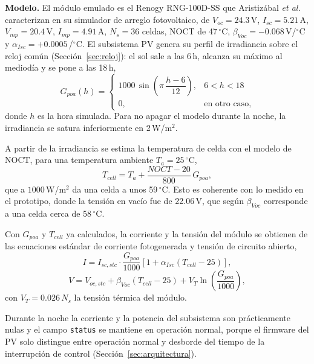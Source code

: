 \documentclass[conference]{IEEEtran}
\begin{document}
\textbf{Modelo.} El módulo emulado es el Renogy RNG-100D-SS que Aristizábal \emph{et al.}~\cite{aristizabal2026pv} caracterizan en su simulador de arreglo fotovoltaico, de $V_{oc}=24.3$\,V, $I_{sc}=5.21$\,A, $V_{mp}=20.4$\,V, $I_{mp}=4.91$\,A, $N_s=36$ celdas, NOCT de 47\,$^{\circ}$C, $\beta_{Voc}=-0.068$\,V/$^{\circ}$C y $\alpha_{Isc}=+0.0005$\,/$^{\circ}$C. El subsistema PV genera su perfil de irradiancia sobre el reloj común (Sección~\ref{sec:reloj}): el sol sale a las 6\,h, alcanza su máximo al mediodía y se pone a las 18\,h,
\begin{equation}
\label{eq:pv_G}
G_{poa}(h) = \begin{cases}
1000\,\sin\!\left(\pi\,\dfrac{h-6}{12}\right), & 6 < h < 18 \\[6pt]
0, & \text{en otro caso,}
\end{cases}
\end{equation}
donde $h$ es la hora simulada. Para no apagar el modelo durante la noche, la irradiancia se satura inferiormente en 2\,W/m$^2$.

A partir de la irradiancia se estima la temperatura de celda con el modelo de NOCT, para una temperatura ambiente $T_a=25\,^{\circ}$C,
\begin{equation}
\label{eq:pv_Tcell}
T_{cell} = T_a + \frac{NOCT-20}{800}\,G_{poa},
\end{equation}
que a $1000$\,W/m$^2$ da una celda a unos 59\,$^{\circ}$C. Esto es coherente con lo medido en el prototipo, donde la tensión en vacío fue de 22.06\,V, que según $\beta_{Voc}$ corresponde a una celda cerca de 58\,$^{\circ}$C.

Con $G_{poa}$ y $T_{cell}$ ya calculados, la corriente y la tensión del módulo se obtienen de las ecuaciones estándar de corriente fotogenerada y tensión de circuito abierto,
\begin{equation}
\label{eq:pv_I}
I = I_{sc,stc}\cdot\frac{G_{poa}}{1000}\left[1+\alpha_{Isc}(T_{cell}-25)\right],
\end{equation}
\begin{equation}
\label{eq:pv_V}
V = V_{oc,stc} + \beta_{Voc}(T_{cell}-25) + V_T \ln\!\left(\frac{G_{poa}}{1000}\right),
\end{equation}
con $V_T=0.026\,N_s$ la tensión térmica del módulo.

Durante la noche la corriente y la potencia del subsistema son prácticamente nulas y el campo \texttt{status} se mantiene en operación normal, porque el firmware del PV solo distingue entre operación normal y desborde del tiempo de la interrupción de control (Sección~\ref{sec:arquitectura}). %
\end{document}
